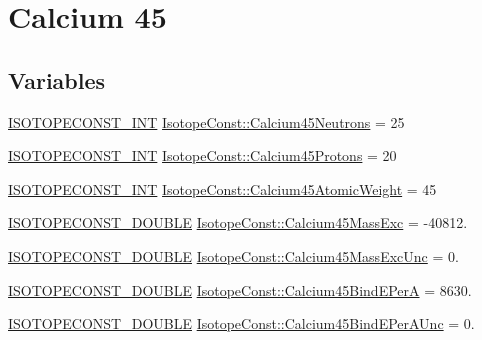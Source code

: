 \hypertarget{group___isotope_const-_calcium-_ca45}{}\section{Calcium 45}
\label{group___isotope_const-_calcium-_ca45}
\subsection*{Variables}
\begin{DoxyCompactItemize}
\item 
\mbox{\hyperlink{group___isotope_const-_macros_ga5f18360b3e99483a35c32d789e62621c}{I\+S\+O\+T\+O\+P\+E\+C\+O\+N\+S\+T\+\_\+\+I\+NT}} \mbox{\hyperlink{group___isotope_const-_calcium-_ca45_ga4b1cedc76484193c9d18f2ceb795d9b8}{Isotope\+Const\+::\+Calcium45\+Neutrons}} = 25
\item 
\mbox{\hyperlink{group___isotope_const-_macros_ga5f18360b3e99483a35c32d789e62621c}{I\+S\+O\+T\+O\+P\+E\+C\+O\+N\+S\+T\+\_\+\+I\+NT}} \mbox{\hyperlink{group___isotope_const-_calcium-_ca45_gad3ae7c88911c96f409d44221e9f108fa}{Isotope\+Const\+::\+Calcium45\+Protons}} = 20
\item 
\mbox{\hyperlink{group___isotope_const-_macros_ga5f18360b3e99483a35c32d789e62621c}{I\+S\+O\+T\+O\+P\+E\+C\+O\+N\+S\+T\+\_\+\+I\+NT}} \mbox{\hyperlink{group___isotope_const-_calcium-_ca45_ga7fb2520e9e2c5a133c4ae7015c578973}{Isotope\+Const\+::\+Calcium45\+Atomic\+Weight}} = 45
\item 
\mbox{\hyperlink{group___isotope_const-_macros_ga8f45a7272ce02c0b4c65c44636ed719a}{I\+S\+O\+T\+O\+P\+E\+C\+O\+N\+S\+T\+\_\+\+D\+O\+U\+B\+LE}} \mbox{\hyperlink{group___isotope_const-_calcium-_ca45_ga4da8f6b0dd6fea284b08f596199524da}{Isotope\+Const\+::\+Calcium45\+Mass\+Exc}} = -\/40812.
\item 
\mbox{\hyperlink{group___isotope_const-_macros_ga8f45a7272ce02c0b4c65c44636ed719a}{I\+S\+O\+T\+O\+P\+E\+C\+O\+N\+S\+T\+\_\+\+D\+O\+U\+B\+LE}} \mbox{\hyperlink{group___isotope_const-_calcium-_ca45_gaacc578e89e978be464fa0e92a4da25f4}{Isotope\+Const\+::\+Calcium45\+Mass\+Exc\+Unc}} = 0.
\item 
\mbox{\hyperlink{group___isotope_const-_macros_ga8f45a7272ce02c0b4c65c44636ed719a}{I\+S\+O\+T\+O\+P\+E\+C\+O\+N\+S\+T\+\_\+\+D\+O\+U\+B\+LE}} \mbox{\hyperlink{group___isotope_const-_calcium-_ca45_ga827b76b53753f7f6231041aef8037575}{Isotope\+Const\+::\+Calcium45\+Bind\+E\+PerA}} = 8630.
\item 
\mbox{\hyperlink{group___isotope_const-_macros_ga8f45a7272ce02c0b4c65c44636ed719a}{I\+S\+O\+T\+O\+P\+E\+C\+O\+N\+S\+T\+\_\+\+D\+O\+U\+B\+LE}} \mbox{\hyperlink{group___isotope_const-_calcium-_ca45_ga40bd50cb269fb76a43031d2e70fc1acc}{Isotope\+Const\+::\+Calcium45\+Bind\+E\+Per\+A\+Unc}} = 0.

\end{DoxyCompactItemize}
